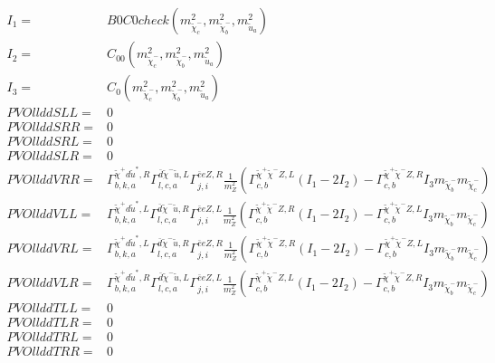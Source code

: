 \documentclass[A4,landscape]{article}
\begin{document}
\begin{align} 
I_1= & B0C0check(m^2_{\tilde{\chi}^-_{{c}}}, m^2_{\tilde{\chi}^-_{{b}}}, m^2_{\tilde{u}_{{a}}}) \\ 
I_2= & C_{00}(m^2_{\tilde{\chi}^-_{{c}}}, m^2_{\tilde{\chi}^-_{{b}}}, m^2_{\tilde{u}_{{a}}}) \\ 
I_3= & C_0(m^2_{\tilde{\chi}^-_{{c}}}, m^2_{\tilde{\chi}^-_{{b}}}, m^2_{\tilde{u}_{{a}}}) \\ 
  PVOllddSLL= & 0 \\ 
  PVOllddSRR= & 0 \\ 
  PVOllddSRL= & 0 \\ 
  PVOllddSLR= & 0 \\ 
  PVOllddVRR= &  \Gamma^{\tilde{\chi}^+d \tilde{u}^*,R}_{b, k, a} \Gamma^{\bar{d}\tilde{\chi}^- \tilde{u} ,L}_{l, c, a} \Gamma^{\bar{e}e Z ,R}_{j, i} \frac{1}{m^2_{Z}} (\Gamma^{\tilde{\chi}^+\tilde{\chi}^- Z ,L}_{c, b} (I_1 - 2 I_2) - \Gamma^{\tilde{\chi}^+\tilde{\chi}^- Z ,R}_{c, b} I_3 m_{\tilde{\chi}^-_{{b}}} m_{\tilde{\chi}^-_{{c}}}) \\ 
  PVOllddVLL= &  \Gamma^{\tilde{\chi}^+d \tilde{u}^*,L}_{b, k, a} \Gamma^{\bar{d}\tilde{\chi}^- \tilde{u} ,R}_{l, c, a} \Gamma^{\bar{e}e Z ,L}_{j, i} \frac{1}{m^2_{Z}} (\Gamma^{\tilde{\chi}^+\tilde{\chi}^- Z ,R}_{c, b} (I_1 - 2 I_2) - \Gamma^{\tilde{\chi}^+\tilde{\chi}^- Z ,L}_{c, b} I_3 m_{\tilde{\chi}^-_{{b}}} m_{\tilde{\chi}^-_{{c}}}) \\ 
  PVOllddVRL= &  \Gamma^{\tilde{\chi}^+d \tilde{u}^*,L}_{b, k, a} \Gamma^{\bar{d}\tilde{\chi}^- \tilde{u} ,R}_{l, c, a} \Gamma^{\bar{e}e Z ,R}_{j, i} \frac{1}{m^2_{Z}} (\Gamma^{\tilde{\chi}^+\tilde{\chi}^- Z ,R}_{c, b} (I_1 - 2 I_2) - \Gamma^{\tilde{\chi}^+\tilde{\chi}^- Z ,L}_{c, b} I_3 m_{\tilde{\chi}^-_{{b}}} m_{\tilde{\chi}^-_{{c}}}) \\ 
  PVOllddVLR= &  \Gamma^{\tilde{\chi}^+d \tilde{u}^*,R}_{b, k, a} \Gamma^{\bar{d}\tilde{\chi}^- \tilde{u} ,L}_{l, c, a} \Gamma^{\bar{e}e Z ,L}_{j, i} \frac{1}{m^2_{Z}} (\Gamma^{\tilde{\chi}^+\tilde{\chi}^- Z ,L}_{c, b} (I_1 - 2 I_2) - \Gamma^{\tilde{\chi}^+\tilde{\chi}^- Z ,R}_{c, b} I_3 m_{\tilde{\chi}^-_{{b}}} m_{\tilde{\chi}^-_{{c}}}) \\ 
  PVOllddTLL= & 0 \\ 
  PVOllddTLR= & 0 \\ 
  PVOllddTRL= & 0 \\ 
  PVOllddTRR= & 0 \\ 
\end{align} 
\end{document}
